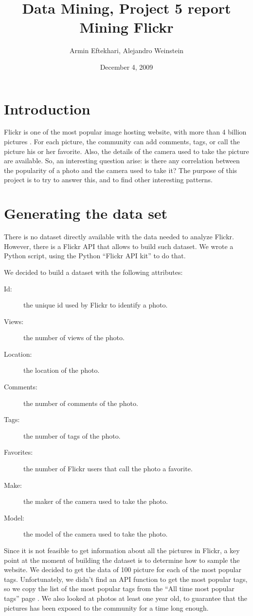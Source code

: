 \documentclass[letter,12pt]{article}
\author{Armin Eftekhari, Alejandro Weinstein}
\title{ Data Mining, Project 5 report\\
Mining Flickr}
\date{December 4, 2009}
\begin{document}
\maketitle

\section{Introduction}

Flickr is one of the most popular image hosting website, with more than 4 billion pictures \cite{wiki_flickr}. For each picture, the community can add comments, tags, or call the picture his or her favorite. Also, the details of the camera used to take the picture are available. So, an interesting question arise: is there any correlation between the popularity of a photo and the camera used to take it? The purpose of this project is to try to answer this, and to find other interesting patterns.

\section{Generating the data set}

There is no dataset directly available with the data needed to analyze Flickr. However, there is a Flickr API that allows to build such dataset. We wrote a Python script, using the Python ``Flickr API kit'' \cite{ web_flickr_api} to do that.

We decided to build a dataset with the following attributes:
\begin{description}
\item[Id:] the unique id used by Flickr to identify a photo.
\item[Views:] the number of views of the photo.
\item[Location:] the location of the photo.
\item[Comments:] the number of comments of the photo.
\item[Tags:] the number of tags of the photo.
\item[Favorites:] the number of Flickr users that call the photo a favorite.
\item[Make:] the maker of the camera used to take the photo.
\item[Model:] the model of the camera used to take the photo.
\end{description}

Since it is not feasible to get information about all the pictures in Flickr, a key point at the moment of building the dataset is to determine how to sample the website. We decided to get the data of 100 picture for each of the most popular tags. Unfortunately, we didn't find an API function to get the most popular tags, so we copy the list of the most popular tags from the ``All time most popular tags'' page \cite{web_flickr_tags}. We also looked at photos at least one year old, to guarantee that the pictures has been exposed to the community for a time long enough.
\end{document}
